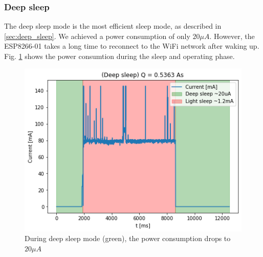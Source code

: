 \subsubsection{Deep sleep}
The deep sleep mode is the most efficient sleep mode, as described in \ref{sec:deep_sleep}. 
We achieved a power consumption of only $20 \mu A$. 
However, the ESP8266-01 takes a long time to reconnect to the WiFi network after waking up.
Fig. \ref{fig:deep_sleep} shows the power consumtion during the sleep and operating phase.
\begin{figure}[h]
    \includegraphics[width = \linewidth]{fig/deep_sleep.png}
    \caption{During deep sleep mode (green), the power consumption drops to $20 \mu A$}
    \label{fig:deep_sleep}
\end{figure}
